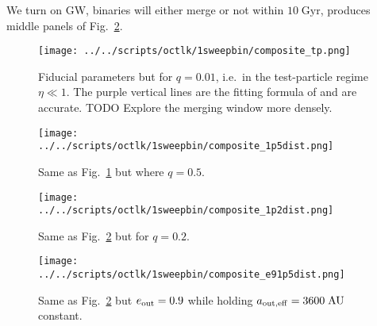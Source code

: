 \documentclass[
        fleqn,
        usenatbib,
    ]{mnras}
\newlength{\colummwidth}
\begin{document}
We turn on GW, binaries will either merge or not within $10\;\mathrm{Gyr}$,
produces middle panels of Fig.~\ref{fig:composites_dist}.
\begin{figure}
    \centering
    \texttt{[image: ../../scripts/octlk/1sweepbin/composite\_tp.png]}
    \caption{Fiducial parameters but for $q = 0.01$, i.e.\ in the test-particle
    regime $\eta \ll 1$. The purple vertical lines are the fitting formula of
    \citet{MLL16} and are accurate. \textcolor{Corr}{TODO Explore the merging
    window more densely.}
    }\label{fig:composites_tp}
\end{figure}
\begin{figure}
    \centering
    \texttt{[image: ../../scripts/octlk/1sweepbin/composite\_1p5dist.png]}
    \caption{Same as Fig.~\ref{fig:composites_tp} but where $q = 0.5$.
    }\label{fig:composites_dist}
\end{figure}
\begin{figure}
    \centering
    \texttt{[image: ../../scripts/octlk/1sweepbin/composite\_1p2dist.png]}
    \caption{Same as Fig.~\ref{fig:composites_dist} but for $q = 0.2$.
    }\label{fig:composites_1p2}
\end{figure}
\begin{figure}
    \centering
    \texttt{[image: ../../scripts/octlk/1sweepbin/composite\_e91p5dist.png]}
    \caption{Same as Fig.~\ref{fig:composites_dist} but $e_{\rm out} = 0.9$
    while holding $a_{\rm out, eff} = 3600\;\mathrm{AU}$ constant.
    }\label{fig:composites_e91p5}
\end{figure}
\end{document}
